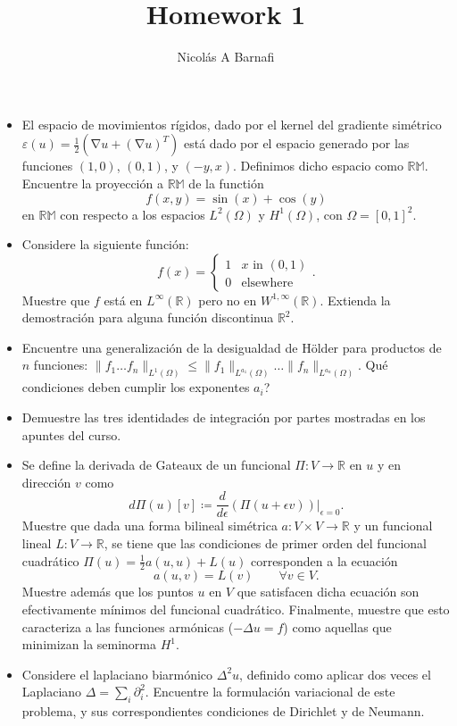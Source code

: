 \documentclass{article}
\title{Homework 1}
\author{Nicol\'as A Barnafi}
\DeclareMathOperator{\grad}{\nabla}
\newcommand{\R}{\mathbb{R}}
\begin{document}
\maketitle

\begin{itemize}
    \item El espacio de movimientos rígidos, dado por el kernel del gradiente simétrico $\varepsilon(u) = \frac 1 2 \left( \grad u + (\grad u)^T \right)$ está dado por el espacio generado por las funciones $(1,0)$, $(0,1)$, y $(-y, x)$. Definimos dicho espacio como $\mathbb{RM}$. Encuentre la proyección a $\mathbb{RM}$ de la functión 
        $$ f(x,y) = \sin(x) + \cos(y) $$
    en $\mathbb{RM}$ con respecto a los espacios $L^2(\Omega)$ y $H^1(\Omega)$, con $\Omega=[0,1]^2$.
    \item Considere la siguiente función: 
        $$ f(x) = \begin{cases}
                        1 & \text{$x$ in $(0,1)$} \\
                        0 & \text{elsewhere}
                    \end{cases}. $$
    Muestre que $f$ está en $L^\infty(\R)$ pero no en $W^{1,\infty}(\R)$. Extienda la demostración para alguna función discontinua $\R^2$. 
    \item Encuentre una generalización de la desigualdad de Hölder para productos de $n$ funciones: $\| f_1 \hdots f_n \|_{L^1(\Omega)} \leq \| f_1\|_{L^{a_1}(\Omega)} \hdots \| f_n \|_{L^{a_n}(\Omega)}$. Qué condiciones deben cumplir los exponentes $a_i$? 
    \item Demuestre las tres identidades de integración por partes mostradas en los apuntes del curso.
    \item Se define la derivada de Gateaux de un funcional $\Pi: V \to \R$ en $u$ y en dirección $v$ como
        $$ d\Pi(u)[v] \coloneqq \frac{d}{d\epsilon}\left.\left(\Pi(u + \epsilon v) \right)\right|_{\epsilon=0}. $$
    Muestre que dada una forma bilineal simétrica $a: V\times V \to \R$ y un funcional lineal $L:V\to \R$, se tiene que las condiciones de primer orden del funcional cuadrático $\Pi(u) = \frac 1 2 a(u,u) + L(u)$ corresponden a la ecuación 
        $$ a(u,v) = L(v) \qquad\forall v \in V. $$
    Muestre además que los puntos $u$ en $V$ que satisfacen dicha ecuación son efectivamente mínimos del funcional cuadrático. Finalmente, muestre que esto caracteriza a las funciones armónicas ($-\Delta u=f$) como aquellas que minimizan la seminorma $H^1$. 
    \item Considere el laplaciano biarmónico $\Delta^2 u$, definido como aplicar dos veces el Laplaciano $\Delta = \sum_i \partial_i^2$. Encuentre la formulación variacional de este problema, y sus correspondientes condiciones de Dirichlet y de Neumann. 

\end{itemize}
\end{document}
